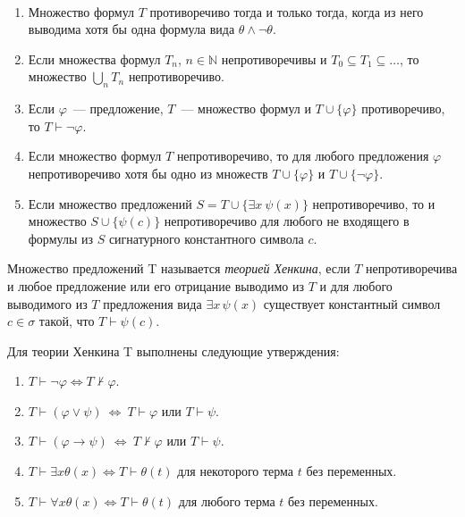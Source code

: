 \begin{prop}\
    \begin{enumerate}
	    \item Множество формул $T$ противоречиво тогда и только тогда, когда из него выводима хотя бы одна формула вида $\theta \land \neg\theta$. 
	    \item Если множества формул $T_n$, $n \in \mathbb{N}$ непротиворечивы и $T_0\subseteq T_1 \subseteq\ldots$, то множество $\bigcup_nT_n$ непротиворечиво. 
	    \item Если $\varphi$~— предложение, $T$~— множество формул и $T\cup\{\varphi\}$ противоречиво, то $T\vdash\neg\varphi$. 
	    \item Если множество формул $T$ непротиворечиво, то для любого предложения $\varphi$ непротиворечиво хотя бы одно из множеств $T\cup\{\varphi\}$ и $T\cup\{\neg\varphi\}$. 
	    \item Если множество предложений $S =T\cup\{\exists x\ \psi(x)\}$ непротиворечиво, то и множество $S\cup\{\psi(c)\}$ непротиворечиво для любого не входящего в формулы из $S$ сигнатурного константного символа $c$. 
        \end{enumerate}
\end{prop}

\begin{definition}
    Множество предложений T называется \emph{теорией Хенкина}, если $T$ непротиворечива и любое предложение или его отрицание выводимо из $T$ и для любого выводимого из $T$ предложения вида $\exists x\,\psi(x)$ существует константный символ $c\in\sigma$ такой, что $T\vdash\psi(c)$.
\end{definition}

\begin{prop}
    Для теории Хенкина T выполнены следующие утверждения:
    \begin{enumerate}
	    \item $T\vdash\neg\varphi\iff T\not\vdash\varphi$. 
	    \item $T\vdash(\varphi \lor \psi)\ \iff\ T\vdash\varphi$ или $T\vdash\psi$. 
	    \item $T\vdash(\varphi \rightarrow \psi)\ \iff\ T\not\vdash\varphi$ или $T\vdash\psi$.
	    \item $T\vdash\exists x \theta(x)\iff  T\vdash\theta(t)$ для
некоторого терма $t$ без переменных. 
	    \item $T\vdash\forall x
\theta(x)\iff  T\vdash\theta(t)$ для любого терма $t$ без переменных.
\end{enumerate}
\end{prop}


